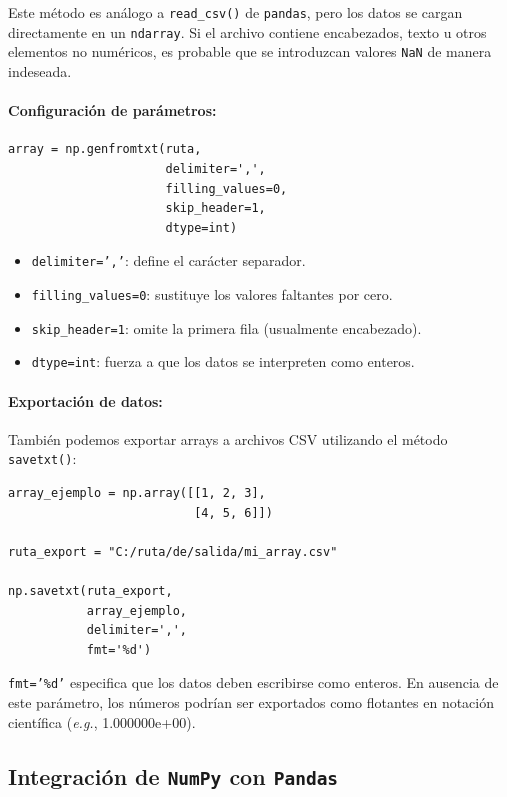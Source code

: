 \documentclass{article}
\theoremstyle{nonumberplain}
\begin{document}
Este método es análogo a \texttt{read\_csv()} de \texttt{pandas}, pero los datos se cargan directamente en un \texttt{ndarray}. Si el archivo contiene encabezados, texto u otros elementos no numéricos, es probable que se introduzcan valores \texttt{NaN} de manera indeseada.

\paragraph{Configuración de parámetros:}

\begin{verbatim}
array = np.genfromtxt(ruta,
                      delimiter=',',
                      filling_values=0,
                      skip_header=1,
                      dtype=int)
\end{verbatim}

\begin{itemize}
  \item \texttt{delimiter=','}: define el carácter separador.
  \item \texttt{filling\_values=0}: sustituye los valores faltantes por cero.
  \item \texttt{skip\_header=1}: omite la primera fila (usualmente encabezado).
  \item \texttt{dtype=int}: fuerza a que los datos se interpreten como enteros.
\end{itemize}

\paragraph{Exportación de datos:}

También podemos exportar arrays a archivos CSV utilizando el método \texttt{savetxt()}:

\begin{verbatim}
array_ejemplo = np.array([[1, 2, 3],
                          [4, 5, 6]])

ruta_export = "C:/ruta/de/salida/mi_array.csv"

np.savetxt(ruta_export,
           array_ejemplo,
           delimiter=',',
           fmt='%d')
\end{verbatim}

\texttt{fmt='\%d'} especifica que los datos deben escribirse como enteros. En ausencia de este parámetro, los números podrían ser exportados como flotantes en notación científica (\textit{e.g.}, 1.000000e+00).

\subsection*{Integración de \texttt{NumPy} con \texttt{Pandas}}
\end{document}
